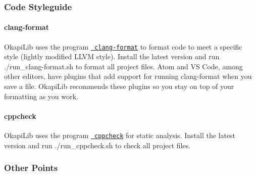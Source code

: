 \subsubsection*{Code Styleguide}

\paragraph*{clang-\/format}

Okapi\+Lib uses the program \href{https://clang.llvm.org/docs/ClangFormat.html}{\texttt{ clang-\/format}} to format code to meet a specific style (lightly modified L\+L\+VM style). Install the latest version and run {\ttfamily ./run\+\_\+clang-\/format.sh} to format all project files. Atom and VS Code, among other editors, have plugins that add support for running clang-\/format when you save a file. Okapi\+Lib recommends these plugins so you stay on top of your formatting as you work.

\paragraph*{cppcheck}

Okapi\+Lib uses the program \href{http://cppcheck.sourceforge.net/}{\texttt{ cppcheck}} for static analysis. Install the latest version and run {\ttfamily ./run\+\_\+cppcheck.sh} to check all project files.

\subsubsection*{Other Points}


